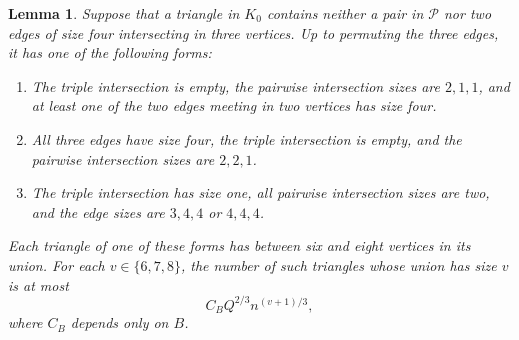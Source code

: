 \documentclass[11pt]{article}
\numberwithin{equation}{section}
\newtheorem{lemma}[theorem]{Lemma}
\theoremstyle{remark}
\begin{document}
\begin{lemma}\label{lem:classification}
Suppose that a triangle in $K_0$ contains neither a pair in $\mathcal P$ nor two edges of size four intersecting in three vertices. Up to permuting the three edges, it has one of the following forms:
\nopagebreak[4]
\begin{enumerate}[label=\textup{(\roman*)}]
\item The triple intersection is empty, the pairwise intersection sizes are $2,1,1$, and at least one of the two edges meeting in two vertices has size four.
\item All three edges have size four, the triple intersection is empty, and the pairwise intersection sizes are $2,2,1$.
\item The triple intersection has size one, all pairwise intersection sizes are two, and the edge sizes are $3,4,4$ or $4,4,4$.
\end{enumerate}
Each triangle of one of these forms has between six and eight vertices in its union. For each $v\in\{6,7,8\}$, the number of such triangles whose union has size $v$ is at most
\begin{equation}\label{eq:triangle-count}
 C_B Q^{2/3} n^{(v+1)/3},
\end{equation}
where $C_B$ depends only on $B$.
\end{lemma}
\end{document}
